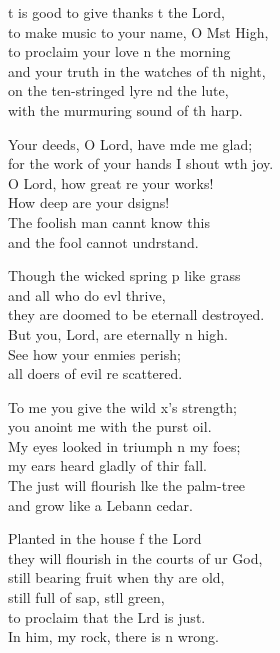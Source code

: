 \settowidth{\versewidth}{for the work of your hands I shout with joy.}
\begin{psalmverse}%
  \begin{patverse}
t is good to give thanks t the Lord,\Med\\
    to make music to your name, O Mst High,\\
to proclaim your love \pointup{\i}n the morning\Med\\
    and your truth in the watches of th night,\\
on the ten-stringed lyre nd the lute,\Med\\
    with the murmuring sound of th harp.

Your deeds, O Lord, have mde me glad;\Med\\
    for the work of your hands I shout w\pointup{\i}th joy.\\
O Lord, how great re your works!\Med\\
    How deep are your dsigns!\\
The foolish man cannt know this\Med\\
    and the fool cannot undrstand.

Though the wicked spring p like grass\Med\\
    and all who do ev\pointup{\i}l thrive,\\
they are doomed to be eternall destroyed.\Med\\
    But you, Lord, are eternally n high.\\
See how your enmies perish;\Med\\
    all doers of evil re scattered.

To me you give the wild x’s strength;\Med\\
    you anoint me with the purst oil.\\
My eyes looked in triumph n my foes;\Med\\
    my ears heard gladly of thir fall.\\
The just will flourish l\pointup{\i}ke the palm-tree\Med\\
    and grow like a Lebann cedar.

Planted in the house f the Lord\Med\\
    they will flourish in the courts of ur God,\\
still bearing fruit when thy are old,\Med\\
    still full of sap, st\pointup{\i}ll green,\\
to proclaim that the Lrd is just.\Med\\
    In him, my rock, there is n wrong.


\end{patverse}
\end{psalmverse}

